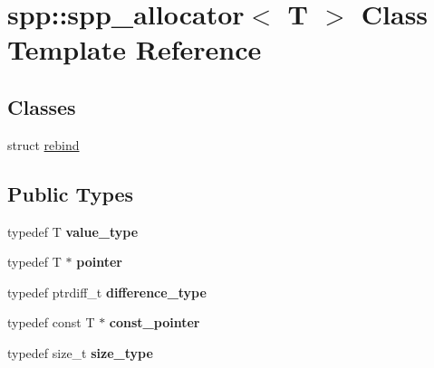 \hypertarget{classspp_1_1spp__allocator}{}\section{spp\+:\+:spp\+\_\+allocator$<$ T $>$ Class Template Reference}
\label{classspp_1_1spp__allocator}
\subsection*{Classes}
\begin{DoxyCompactItemize}
\item 
struct \hyperlink{structspp_1_1spp__allocator_1_1rebind}{rebind}
\end{DoxyCompactItemize}
\subsection*{Public Types}
\begin{DoxyCompactItemize}
\item 
typedef T {\bfseries value\+\_\+type}\hypertarget{classspp_1_1spp__allocator_ab155e1727fe6af8be7f5a27b6364c6e4}{}\label{classspp_1_1spp__allocator_ab155e1727fe6af8be7f5a27b6364c6e4}

\item 
typedef T $\ast$ {\bfseries pointer}\hypertarget{classspp_1_1spp__allocator_a922646557e3c1fff6fcf460bd0aa7f04}{}\label{classspp_1_1spp__allocator_a922646557e3c1fff6fcf460bd0aa7f04}

\item 
typedef ptrdiff\+\_\+t {\bfseries difference\+\_\+type}\hypertarget{classspp_1_1spp__allocator_a91c8764966868ec110c6f271b1f17101}{}\label{classspp_1_1spp__allocator_a91c8764966868ec110c6f271b1f17101}

\item 
typedef const T $\ast$ {\bfseries const\+\_\+pointer}\hypertarget{classspp_1_1spp__allocator_a984f2a6c28de33f5eb0387478cdbc044}{}\label{classspp_1_1spp__allocator_a984f2a6c28de33f5eb0387478cdbc044}

\item 
typedef size\+\_\+t {\bfseries size\+\_\+type}\hypertarget{classspp_1_1spp__allocator_a1555b3db67175037711aa249b14e4e34}{}\label{classspp_1_1spp__allocator_a1555b3db67175037711aa249b14e4e34}

\end{DoxyCompactItemize}

